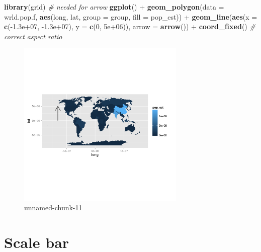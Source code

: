 \documentclass[]{article}
\newenvironment{Shaded}{}{}
\newcommand{\KeywordTok}[1]{\textcolor[rgb]{0.00,0.44,0.13}{\textbf{{#1}}}}
\newcommand{\DataTypeTok}[1]{\textcolor[rgb]{0.56,0.13,0.00}{{#1}}}
\newcommand{\DecValTok}[1]{\textcolor[rgb]{0.25,0.63,0.44}{{#1}}}
\newcommand{\FloatTok}[1]{\textcolor[rgb]{0.25,0.63,0.44}{{#1}}}
\newcommand{\CommentTok}[1]{\textcolor[rgb]{0.38,0.63,0.69}{\textit{{#1}}}}
\newcommand{\NormalTok}[1]{{#1}}
\let\Oldincludegraphics\includegraphics
\renewcommand{\includegraphics}[1]{\Oldincludegraphics[width=8cm]{#1}}
\begin{document}
\begin{Shaded}
\begin{Highlighting}[]
\KeywordTok{library}\NormalTok{(grid)  }\CommentTok{# needed for arrow}
\KeywordTok{ggplot}\NormalTok{() + }\KeywordTok{geom_polygon}\NormalTok{(}\DataTypeTok{data =} \NormalTok{wrld.pop.f, }\KeywordTok{aes}\NormalTok{(long, lat, }\DataTypeTok{group =} \NormalTok{group, }\DataTypeTok{fill =} \NormalTok{pop_est)) + }
    \KeywordTok{geom_line}\NormalTok{(}\KeywordTok{aes}\NormalTok{(}\DataTypeTok{x =} \KeywordTok{c}\NormalTok{(-}\FloatTok{1.3e+07}\NormalTok{, -}\FloatTok{1.3e+07}\NormalTok{), }\DataTypeTok{y =} \KeywordTok{c}\NormalTok{(}\DecValTok{0}\NormalTok{, }\FloatTok{5e+06}\NormalTok{)), }\DataTypeTok{arrow =} \KeywordTok{arrow}\NormalTok{()) + }
    \KeywordTok{coord_fixed}\NormalTok{()  }\CommentTok{# correct aspect ratio}
\end{Highlighting}
\end{Shaded}
\begin{figure}[htbp]
\centering
\includegraphics{figure/unnamed-chunk-11.png}
\caption{unnamed-chunk-11}
\end{figure}

\section{Scale bar}
\end{document}

